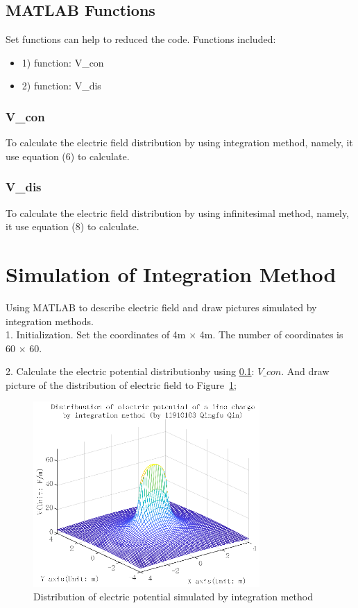 \documentclass[10pt, journal, final]{IEEEtran}
\begin{document}
\subsection{
    MATLAB Functions
}
\label{func}
Set functions can help to reduced the code.
Functions included:
\begin{itemize}
    \item 1) function: V\_con
    \item 2) function: V\_dis
\end{itemize}

\subsubsection*{
    V\_con
}
\label{V_con}
To calculate the electric field distribution
by using integration method, namely, it use equation (6) to calculate.


\subsubsection*{
    V\_dis
}
\label{V_dis}
To calculate the electric field distribution
by using infinitesimal method, namely, it use equation (8) to calculate.


\section{
  Simulation of Integration Method
 }
\label{sec:inte}
Using MATLAB to describe electric field and draw pictures
simulated by integration methods.\\
1. Initialization. Set the coordinates of 4m $\times$ 4m.
The number of coordinates is 60 $\times$ 60.

\label{work1.1}

2. Calculate the electric potential distributionby using \ref{func}: $V\_con$.
And draw picture of the distribution of electric field to Figure~\ref{fig:1.1};

\label{work1.2}

\begin{figure}[htbp]
    \centering
    \includegraphics[width = 3.4in]{figures-2/fig1.1.eps}
    \caption{Distribution of electric potential simulated by integration method}
    \label{fig:1.1}
\end{figure}
\end{document}
